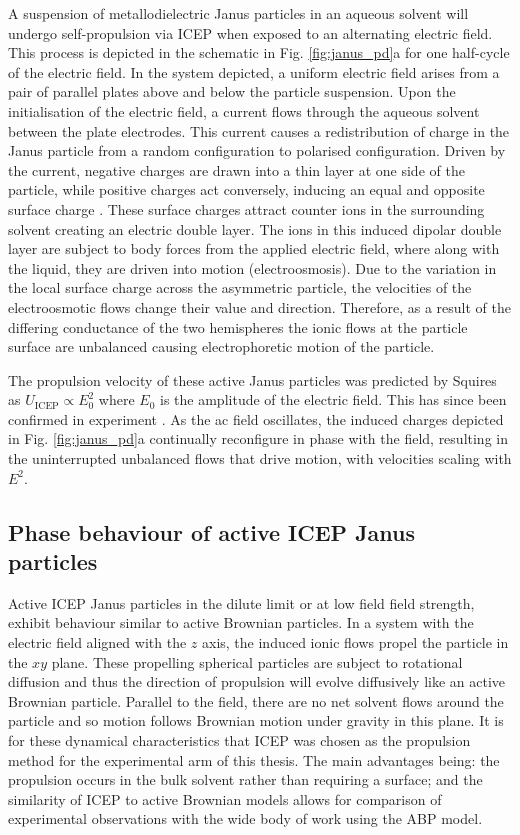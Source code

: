A suspension of metallodielectric Janus particles in an aqueous solvent will undergo self-propulsion via ICEP when exposed to an alternating electric field. This process is depicted in the schematic in Fig. \ref{fig:janus_pd}a for one half-cycle of the electric field. 
In the system depicted, a uniform electric field arises from a pair of parallel plates above and below the particle suspension. Upon the initialisation of the electric field, a current flows through the aqueous solvent between the plate electrodes. This current causes a redistribution of charge in the Janus particle from a random configuration to polarised configuration. Driven by the current, negative charges are drawn into a thin layer at one side of the particle, while positive charges act conversely, inducing an equal and opposite surface charge \cite{daghighi2011}. These surface charges attract counter ions in the surrounding solvent creating an electric double layer.
The ions in this induced dipolar double layer are subject to body forces from the applied electric field, where along with the liquid, they are driven into motion (electroosmosis). 
Due to the variation in the local surface charge across the asymmetric particle, the velocities of the electroosmotic flows change their value and direction.
Therefore, as a result of the differing conductance of the two hemispheres the ionic flows at the particle surface are unbalanced causing electrophoretic motion of the particle.

The propulsion velocity of these active Janus particles was predicted by Squires \etal \cite{squires2006} as $U_{\mathrm{ICEP}} \propto E_{0}^2$ where $E_0$ is the amplitude of the electric field. This has since been confirmed in experiment \cite{gangwal2008}.
As the ac field oscillates, the induced charges depicted in Fig. \ref{fig:janus_pd}a continually reconfigure in phase with the field, resulting in the uninterrupted unbalanced flows that drive motion, with velocities scaling with $E^2$.



\subsection{Phase behaviour of active ICEP Janus particles}
Active ICEP Janus particles in the dilute limit or at low field field strength, exhibit behaviour similar to active Brownian particles. In a system with the electric field aligned with the $z$ axis, the induced ionic flows propel the particle in the $xy$ plane. These propelling spherical particles are subject to rotational diffusion and thus the direction of propulsion will evolve diffusively like an active Brownian particle. Parallel to the field, there are no net solvent flows around the particle and so motion follows Brownian motion under gravity in this plane. It is for these dynamical characteristics that ICEP was chosen as the propulsion method for the experimental arm of this thesis. The main advantages being: the propulsion occurs in the bulk solvent rather than requiring a surface; and the similarity of  ICEP to active Brownian models allows for comparison of experimental observations with the wide body of work using the ABP model. 

